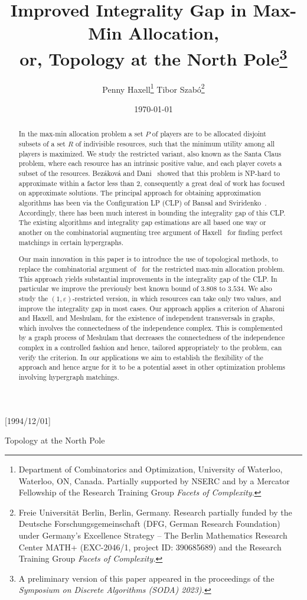 \NeedsTeXFormat{LaTeX2e}[1994/12/01]\documentclass[letterpaper, 11pt]{article}
\title{Improved Integrality Gap in 
  Max-Min Allocation, \\
or, Topology at the North Pole\footnote{A preliminary version of this
  paper appeared in the proceedings of the {\em Symposium on Discrete
  Algorithms (SODA) 2023).}}}
\author{Penny Haxell\thanks{Department of Combinatorics and
   Optimization, University of Waterloo, Waterloo, ON,
   Canada. Partially supported by NSERC and by a
   Mercator Fellowship of the Research Training Group {\em Facets of Complexity}.}
 \quad Tibor Szab\'{o}\thanks{Freie Universit\"at Berlin, Berlin,
  Germany. Research partially funded by the Deutsche
   Forschungsgemeinschaft (DFG, German Research Foundation)
  under Germany's Excellence Strategy – The Berlin Mathematics 
  Research Center MATH+ (EXC-2046/1, project ID: 390685689) and the
  Research
  Training Group \emph{Facets of Complexity.}}}
\date{\today}
\theoremstyle{definition}
\theoremstyle{remark}
\numberwithin{equation}{section}
\begin{document}
\maketitle
{}
{Topology at the North Pole}
\renewcommand{\sectionmark}[1]{}

\begin{abstract}
  In the max-min allocation problem a set $P$ of
  players are to be allocated disjoint subsets of a set $R$ of
  indivisible resources, 
  such that the minimum utility among all players is maximized.
  We study the restricted variant, also known as the Santa Claus
  problem, where each resource has an intrinsic positive value, and
  each player covets a subset of the resources.
Bez\'akov\'a and Dani~\cite{bezakovadani} showed that this problem
  is NP-hard to approximate within a factor less than $2$,
  consequently a great deal of work has focused on approximate solutions.
  The principal approach for obtaining
  approximation algorithms has been via the Configuration LP (CLP) of Bansal and
  Sviridenko~\cite{bansalsviridenko}. Accordingly, there has been
  much interest in bounding the integrality gap of this CLP. 
The existing algorithms and integrality gap estimations are all based
  one way or another on the combinatorial augmenting tree
argument of Haxell~\cite{haxell} for finding perfect matchings in certain
hypergraphs.


Our main innovation in this paper is to introduce the use of topological
methods, to replace the combinatorial argument of~\cite{haxell}
for the restricted max-min allocation problem. This approach yields substantial
improvements in the integrality gap of the CLP. In particular we
improve the previously best known bound of
$3.808$ to $3.534$. We also study the $(1,\varepsilon)$-restricted
version, in which resources can take only two values, and improve the
integrality gap in most cases.
Our approach applies a criterion of Aharoni and Haxell, and Meshulam, for the
existence of independent transversals in graphs, which involves
the connectedness of the independence complex. This is complemented by 
a graph process of Meshulam that decreases the connectedness of the
independence complex in a controlled fashion and hence, tailored
appropriately to the problem, can verify the criterion.  
In our applications we aim to establish the flexibility of the
approach and hence argue for it to be a potential asset in other
optimization problems involving hypergraph matchings. 


\end{abstract}
\end{document}
